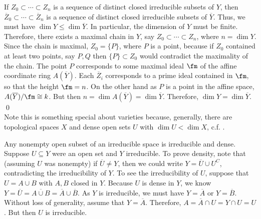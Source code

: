 \pf If $Z_0 \subset \cdots \subset Z_n$ is a sequence of distinct closed irreducible subsets of $Y$, then $\overline{Z}_0 \subset \cdots \subset \overline{Z}_n$ is a sequence of distinct closed irreducible subsets of $\overline{Y}$. Thus, we must have $\dim Y \leq \dim \overline{Y}$. In particular, the dimension of $Y$ must be finite. Therefore, there exists a maximal chain in $Y$, say $Z_0 \subset \cdots \subset Z_n$, where $n= \dim Y$. Since the chain is maximal, $Z_0=\{P\}$, where $P$ is a point, because if $Z_0$ contained at least two points, say $P,Q$ then $\{P\} \subset Z_0$ would contradict the maximality of the chain. The point $P$ corresponds to some maximal ideal $\fm$ of the affine coordinate ring $A(\overline{Y})$. Each $\overline{Z}_i$ corresponds to a prime ideal contained in $\fm$, so that the height $\fm= n$. On the other hand as $P$ is a point in the affine space, $A(\overline{Y})/\fm \cong k$. But then $n= \dim A(\overline{Y})= \dim \overline{Y}$. Therefore, $\dim Y= \dim \overline{Y}$. \qed \\


Note this is something special about varieties because, generally, there are topological spaces $X$ and dense open sets $U$ with $\dim U < \dim X$, c.f. \cite[Exercise 1.10]{hart}.



\begin{ex}
Any nonempty open subset of an irreducible space is irreducible and dense. Suppose $U \subseteq Y$ were an open set and $Y$ irreducible. To prove density, note that (assuming $U$ was nonempty) if $\overline{U} \neq Y$, then we could write $Y= \overline{U} \cup U^C$, contradicting the irreducibility of $Y$. To see the irreducibility of $U$, suppose that $U= A \cup B$ with $A,B$ closed in $Y$. Because $U$ is dense in $Y$, we know $Y= \overline{U}= \overline{A \cup B}= \overline{A} \cup \overline{B}$. As $Y$ is irreducible, we must have $Y= \overline{A}$ or $Y= \overline{B}$. Without loss of generality, assume that $Y= \overline{A}$. Therefore, $A= \overline{A} \cap U= Y \cap U= U$. But then $U$ is irreducible. \xqed
\end{ex}



























